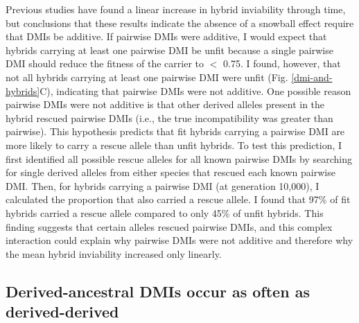 \begin{doublespace}
Previous studies have found a linear increase
in hybrid inviability through time,
but conclusions that these results indicate the absence
of a snowball effect require that DMIs be additive.
%
If pairwise DMIs were additive, I would expect that hybrids
carrying at least one pairwise DMI be unfit
because a single pairwise DMI should reduce
the fitness of the carrier to $<$ 0.75.
%
I found, however, that not all hybrids
carrying at least one pairwise DMI were unfit
(Fig. \ref{dmi-and-hybrids}C),
indicating that pairwise DMIs were not additive.
%
One possible reason pairwise DMIs were not additive
is that other derived alleles present in the hybrid rescued pairwise DMIs
(i.e., the true incompatibility was greater than pairwise).
%
This hypothesis predicts that fit hybrids carrying a pairwise DMI
are more likely to carry a rescue allele than unfit hybrids.
%
To test this prediction,
I first identified all possible rescue alleles for all known pairwise DMIs
by searching for single derived alleles from either species
that rescued each known pairwise DMI.
%
Then, for hybrids carrying a pairwise DMI (at generation 10,000),
I calculated the proportion that also carried a rescue allele.
%
I found that 97\% of fit hybrids carried a rescue allele
compared to only 45\% of unfit hybrids.
%
This finding suggests that certain alleles rescued pairwise DMIs,
and this complex interaction could explain
why pairwise DMIs were not additive and therefore
why the mean hybrid inviability increased only linearly.



\subsection{Derived-ancestral DMIs occur as often as derived-derived}


\end{doublespace}
